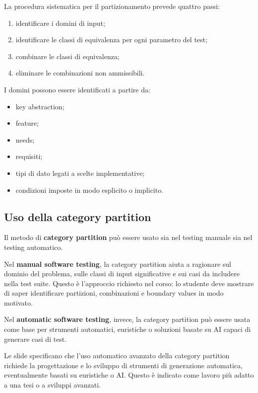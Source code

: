 La procedura sistematica per il partizionamento prevede quattro passi:

\begin{enumerate}
    \item identificare i domini di input;
    \item identificare le classi di equivalenza per ogni parametro del test;
    \item combinare le classi di equivalenza;
    \item eliminare le combinazioni non ammissibili.
\end{enumerate}

I domini possono essere identificati a partire da:

\begin{itemize}
    \item key abstraction;
    \item feature;
    \item needs;
    \item requisiti;
    \item tipi di dato legati a scelte implementative;
    \item condizioni imposte in modo esplicito o implicito.
\end{itemize}

\subsection{Uso della category partition}

Il metodo di \textbf{category partition} può essere usato sia nel testing manuale sia nel testing automatico.

Nel \textbf{manual software testing}, la category partition aiuta a ragionare sul dominio del problema, sulle classi di input significative e sui casi da includere nella test suite. Questo è l'approccio richiesto nel corso: lo studente deve mostrare di saper identificare partizioni, combinazioni e boundary values in modo motivato.

Nel \textbf{automatic software testing}, invece, la category partition può essere usata come base per strumenti automatici, euristiche o soluzioni basate su AI capaci di generare casi di test.

\begin{notaslide}
Le slide specificano che l'uso automatico avanzato della category partition richiede la progettazione e lo sviluppo di strumenti di generazione automatica, eventualmente basati su euristiche o AI. Questo è indicato come lavoro più adatto a una tesi o a sviluppi avanzati.
\end{notaslide}

